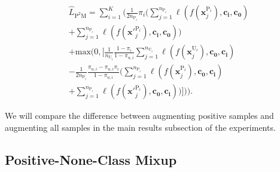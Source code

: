 \documentclass[letterpaper]{article}
\begin{document}
\begin{equation}
\begin{aligned}\label{eq9}
&\widehat{L}_{\mathrm{P^{2}M}}=\sum_{i=1}^{K}( \frac{1}{2n_{\mathrm{P}_{i}}}\pi_{i} (\sum_{j=1}^{n_{\mathrm{P}_{i}}}\ell(f(\boldsymbol{x}_{j}^{\mathrm{P}_{i}}), \boldsymbol{c_{i}}, \boldsymbol{c_{0}}) \\&+ \sum_{j=1}^{n_{\mathrm{P}_{i}}}\ell(f(\boldsymbol{x'}_{j}^{\mathrm{P}_{i}}), \boldsymbol{c_{i}}, \boldsymbol{c_{0}})) \\&+\mathrm{max}(0, [\frac{1}{n_{\mathrm{U}_{i}}} \frac{1-\pi_{i}}{1-\pi_{u,i}} \sum_{j=1}^{n_{\mathrm{U}_{i}}} \ell(f(\boldsymbol{x}_{j}^{\mathrm{U}_{i}}), \boldsymbol{c_{0}}, \boldsymbol{c_{i}})\\&-\frac{1}{2n_{\mathrm{P}_{i}}}\frac{\pi_{u,i}-\pi_{u,i} \pi_{i}}{1-\pi_{u,i}} (\sum_{j=1}^{n_{\mathrm{P}_{i}}}\ell(f(\boldsymbol{x}_{j}^{\mathrm{P}_{i}}), \boldsymbol{c_{0}}, \boldsymbol{c_{i}}) \\&+ \sum_{j=1}^{n_{\mathrm{P}_{i}}}\ell(f(\boldsymbol{x'}_{j}^{\mathrm{P}_{i}}), \boldsymbol{c_{0}}, \boldsymbol{c_{i}}))])).
\end{aligned}
\end{equation}

We will compare the difference between augmenting positive samples and augmenting all samples in the main results subsection of the experiments.

\subsection{Positive-None-Class Mixup}
\end{document}
